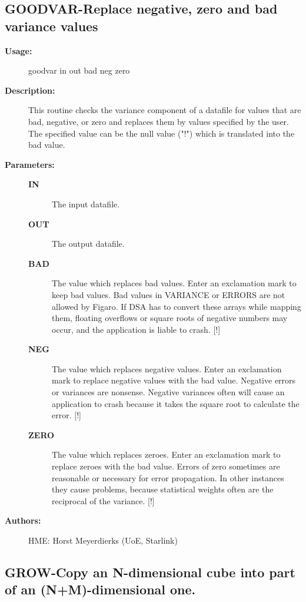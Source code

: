 \begin{description}
\subsection{GOODVAR-\label{GOODVAR}Replace negative, zero and bad variance values}
\begin{description}

\item [\textbf{Usage:}]
 goodvar in out bad neg zero

\item [\textbf{Description:}]
 This routine checks the variance component of a datafile for
 values that are bad, negative, or zero and replaces them by
 values specified by the user. The specified value can be the
 null value ("!") which is translated into the bad value.

\item [\textbf{Parameters:}]
\begin{description}
\item [\textbf{IN}]
 The input datafile.
\item [\textbf{OUT}]
 The output datafile.
\item [\textbf{BAD}]
 The value which replaces bad values. Enter an exclamation mark
 to keep bad values.
 Bad values in VARIANCE or ERRORS are not allowed by Figaro. If
 DSA has to convert these arrays while mapping them, floating
 overflows or square roots of negative numbers may occur, and
 the application is liable to crash. [!]
\item [\textbf{NEG}]
 The value which replaces negative values. Enter an exclamation
 mark to replace negative values with the bad value. Negative
 errors or variances are nonsense. Negative variances often will
 cause an application to crash because it takes the square root
 to calculate the error. [!]
\item [\textbf{ZERO}]
 The value which replaces zeroes. Enter an exclamation mark
 to replace zeroes with the bad value.
 Errors of zero sometimes are reasonable or necessary for error
 propagation. In other instances they cause problems, because
 statistical weights often are the reciprocal of the variance.
 [!]
\end{description}

\item [\textbf{Authors:}]
 HME: Horst Meyerdierks (UoE, Starlink)
\end{description}
\subsection{GROW-\label{GROW}Copy an N-dimensional cube into part of an (N+M)-dimensional one.}
\begin{description}


\end{description}
\end{description}
